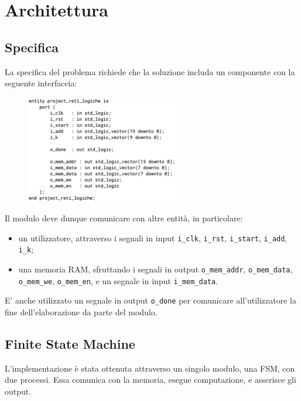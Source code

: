\documentclass{article}
\begin{document}

\newpage
\section{Architettura}
\subsection{Specifica}
La specifica del problema richiede che la soluzione includa un componente con la seguente interfaccia:

\begin{figure}[h]
    \centering
    \includegraphics[width=0.6\textwidth]{images/interface.png}
\end{figure}

Il modulo deve dunque comunicare con altre entità, in particolare:
\begin{itemize}[label=\raisebox{0.25ex}{\tiny$\bullet$}]
    \item un utilizzatore, attraverso i segnali in input \texttt{i\_clk}, \texttt{i\_rst}, \texttt{i\_start}, \texttt{i\_add}, \texttt{i\_k};
    \item una memoria RAM, sfruttando i segnali in output \texttt{o\_mem\_addr}, \texttt{o\_mem\_data}, \texttt{o\_mem\_we}, \texttt{o\_mem\_en}, e un segnale in input \texttt{i\_mem\_data}.
\end{itemize}
E' anche utilizzato un segnale in output \texttt{o\_done} per comunicare all'utilizzatore la fine dell'ela\-borazione da parte del modulo.

\subsection{Finite State Machine}
L'implementazione è stata ottenuta attraverso un singolo modulo, una FSM, con due processi.
Essa comunica con la memoria, esegue computazione, e asserisce gli output.
\end{document}
